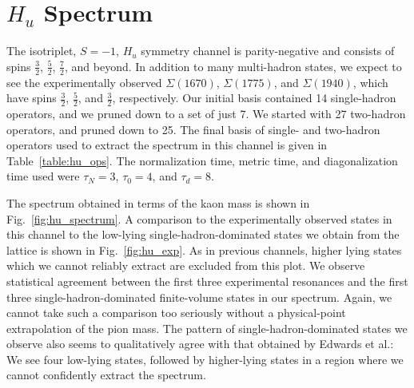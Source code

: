 \newpage
\section{$H_u$ Spectrum}
The isotriplet, $S=-1$, $H_u$ symmetry channel is parity-negative and consists of spins $\frac{3}{2}$, $\frac{5}{2}$, $\frac{7}{2}$, and beyond. In addition to many multi-hadron states, we expect to see the experimentally observed $\Sigma(1670)$, $\Sigma(1775)$, and $\Sigma(1940)$, which have spins $\frac{3}{2}$, $\frac{5}{2}$, and $\frac{3}{2}$, respectively. Our initial basis contained 14 single-hadron operators, and we pruned down to a set of just 7. We started with 27 two-hadron operators, and pruned down to 25. The final basis of single- and two-hadron operators used to extract the spectrum in this channel is given in Table~\ref{table:hu_ops}. The normalization time, metric time, and diagonalization time used were $\tau_N=3$, $\tau_0=4$, and $\tau_d=8$.

The spectrum obtained in terms of the kaon mass is shown in Fig.~\ref{fig:hu_spectrum}. A comparison to the experimentally observed states in this channel to the low-lying single-hadron-dominated states we obtain from the lattice is shown in Fig.~\ref{fig:hu_exp}. As in previous channels, higher lying states which we cannot reliably extract are excluded from this plot. We observe statistical agreement between the first three experimental resonances and the first three single-hadron-dominated finite-volume states in our spectrum. Again, we cannot take such a comparison too seriously without a physical-point extrapolation of the pion mass. The pattern of single-hadron-dominated states we observe also seems to qualitatively agree with that obtained by Edwards et al.: We see four low-lying states, followed by higher-lying states in a region where we cannot confidently extract the spectrum.

